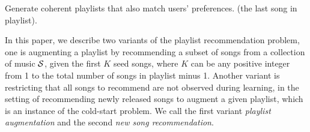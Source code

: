 Generate coherent playlists that also match users' preferences. (the last song in playlist)\cite{jannach2015beyond}.



In this paper, we describe two variants of the playlist recommendation problem,
one is augmenting a playlist by recommending a subset of songs from a collection of music $\mathcal{S}$,
given the first $K$ seed songs, where $K$ can be any positive integer from 1 to the total number of songs in playlist minus 1.
Another variant is restricting that all songs to recommend are not observed during learning,
\ie in the setting of recommending newly released songs to augment a given playlist, which is an instance of the cold-start problem.
We call the first variant \emph{playlist augmentation} and the second \emph{new song recommendation}.
